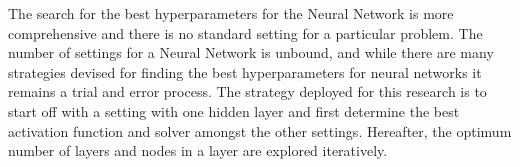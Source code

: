 The search for the best hyperparameters for the Neural Network is more comprehensive and there is no standard setting for a particular problem. 
The number of settings for a Neural Network is unbound, and while there are many strategies devised for finding the best hyperparameters for neural networks \cite{larochelle2009exploring} it remains a trial and error process.
The strategy deployed for this research is to start off with a setting with one hidden layer and first determine the best activation function and solver amongst the other settings.
Hereafter, the optimum number of layers and nodes in a layer are explored iteratively.
